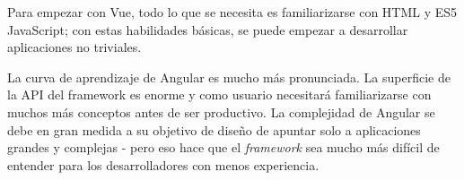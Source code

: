 Para empezar con Vue, todo lo que se necesita es familiarizarse con HTML y ES5 JavaScript; con estas habilidades básicas, se puede empezar a desarrollar aplicaciones no triviales.


La curva de aprendizaje de Angular es mucho más pronunciada. La superficie de la API del framework es enorme y como usuario necesitará familiarizarse con muchos más conceptos antes de ser productivo. La complejidad de Angular se debe en gran medida a su objetivo de diseño de apuntar solo a aplicaciones grandes y complejas - pero eso hace que el \textit{framework} sea mucho más difícil de entender para los desarrolladores con menos experiencia.
